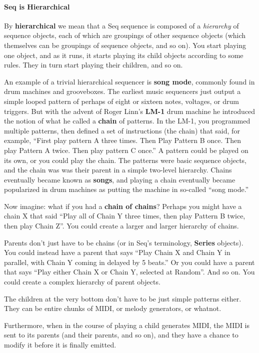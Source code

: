 \documentclass[twoside,10pt]{article}
\begin{document}
\paragraph{Seq is Hierarchical}
By {\bf hierarchical} we mean that a Seq sequence is composed of a {\it hierarchy} of sequence objects, each of which are groupings of other sequence objects (which themselves can be groupings of sequence objects, and so on).  You start playing one object, and as it runs, it starts playing its child objects according to some rules.  They in turn start playing their children, and so on.

An example of a trivial hierarchical sequencer is {\bf song mode}, commonly found in drum machines and grooveboxes.  The earliest music sequencers just output a simple looped pattern of perhaps of eight or sixteen notes, voltages, or drum triggers.  But with the advent of Roger Linn's {\bf LM-1} drum machine he introduced the notion of what he called a {\bf chain} of patterns.  In the LM-1, you programmed multiple patterns, then defined a set of instructions (the chain) that said, for example, ``First play pattern A three times. Then Play Pattern B once.  Then play Pattern A twice.  Then play pattern C once.''   A pattern could be played on its own, or you could play the chain.  The patterns were basic sequence objects, and the chain was was their parent in a simple two-level hierarchy.   Chains eventually became known as {\bf songs}, and playing a chain eventually became popularized in drum machines as putting the machine in so-called ``song mode.''

Now imagine: what if you had a {\bf chain of chains}?  Perhaps you might have a chain X that said ``Play all of Chain Y three times, then play Pattern B twice, then play Chain Z''.  You could create a larger and larger hierarchy of chains.

Parents don't just have to be chains (or in Seq's terminology, {\bf Series} objects).  You could instead have a parent that says ``Play Chain X and Chain Y in parallel, with Chain Y coming in delayed by 5 beats.''  Or you could have a parent that says ``Play either Chain X or Chain Y, selected at Random''.  And so on.  You could create a complex hierarchy of parent objects.

The children at the very bottom don't have to be just simple patterns either.  They can be entire chunks of MIDI, or melody generators, or whatnot.  

Furthermore, when in the course of playing a child generates MIDI, the MIDI is sent to its parents (and their parents, and so on), and they have a chance to modify it before it is finally emitted.
\end{document}
